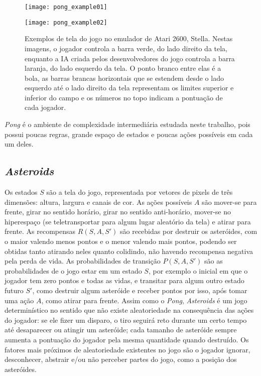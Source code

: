 \begin{figure}[h!]
  \begin{minipage}[b]{.5\textwidth}
  \centering
  \texttt{[image: pong\_example01]}
  \end{minipage}
  \hfill
  \begin{minipage}[b]{.5\textwidth}
  \texttt{[image: pong\_example02]}
  \end{minipage}
  \caption{Exemplos de tela do jogo no emulador de Atari 2600, Stella. Nestas imagens, o jogador controla a barra verde, do lado direito da tela, enquanto a IA criada pelos desenvolvedores do jogo controla a barra laranja, do lado esquerdo da tela. O ponto branco entre elas é a bola, as barras brancas horizontais que se estendem desde o lado esquerdo até o lado direito da tela representam os limites superior e inferior do campo e os números no topo indicam a pontuação de cada jogador.}
\end{figure}

\textit{Pong} é o ambiente de complexidade intermediária estudada neste trabalho, pois possui poucas regras, grande espaço de estados e poucas ações possíveis em cada um deles.

\subsection{\textit{Asteroids}}
\label{sec:env_asteroids}

Os estados $S$ são a tela do jogo, representada por vetores de pixels de três dimensões: altura, largura e canais de cor.
As ações possíveis $A$ são mover-se para frente, girar no sentido horário, girar no sentido anti-horário, mover-se no hiperespaço (se teletransportar para algum lugar aleatório da tela) e atirar para frente.
As recompensas $R(S,A,S')$ são recebidas por destruir os asteróides, com o maior valendo menos pontos e o menor valendo mais pontos, podendo ser obtidas tanto atirando neles quanto colidindo, não havendo recompensa negativa pela perda de vida.
As probabilidades de transição $P(S,A,S')$ são as probabilidades de o jogo estar em um estado $S$, por exemplo o inicial em que o jogador tem zero pontos e todas as vidas, e transitar para algum outro estado futuro $S'$, como destruir algum asteróide e receber pontos por isso, após tomar uma ação $A$, como atirar para frente.
Assim como o \textit{Pong}, \textit{Asteroids} é um jogo determinístico no sentido que não existe aleatoriedade na consequência das ações do jogador: se ele fizer um disparo, o tiro seguirá reto durante um certo tempo até desaparecer ou atingir um asteróide; cada tamanho de asteróide sempre aumenta a pontuação do jogador pela mesma quantidade quando destruído.
Os fatores mais próximos de aleatoriedade existentes no jogo são o jogador ignorar, desconhecer, abstrair e/ou não perceber partes do jogo, como a posição dos asteróides.

